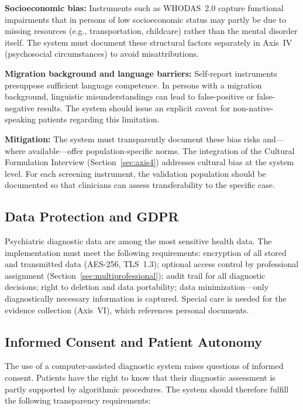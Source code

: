 \documentclass[11pt,a4paper]{article}
\begin{document}
\textbf{Socioeconomic bias:} Instruments such as WHODAS~2.0 capture functional impairments that in persons of low socioeconomic status may partly be due to missing resources (e.g., transportation, childcare) rather than the mental disorder itself. The system must document these structural factors separately in Axis~IV (psychosocial circumstances) to avoid misattributions.

\textbf{Migration background and language barriers:} Self-report instruments presuppose sufficient language competence. In persons with a migration background, linguistic misunderstandings can lead to false-positive or false-negative results. The system should issue an explicit caveat for non-native-speaking patients regarding this limitation.

\textbf{Mitigation:} The system must transparently document these bias risks and---where available---offer population-specific norms. The integration of the Cultural Formulation Interview (Section~\ref{sec:axis4}) addresses cultural bias at the system level. For each screening instrument, the validation population should be documented so that clinicians can assess transferability to the specific case.

\subsection{Data Protection and GDPR}

Psychiatric diagnostic data are among the most sensitive health data. The implementation must meet the following requirements: encryption of all stored and transmitted data (AES-256, TLS~1.3); optional access control by professional assignment (Section~\ref{sec:multiprofessional}); audit trail for all diagnostic decisions; right to deletion and data portability; data minimization---only diagnostically necessary information is captured. Special care is needed for the evidence collection (Axis~VI), which references personal documents.

\subsection{Informed Consent and Patient Autonomy}

The use of a computer-assisted diagnostic system raises questions of informed consent. Patients have the right to know that their diagnostic assessment is partly supported by algorithmic procedures. The system should therefore fulfill the following transparency requirements:
\end{document}
